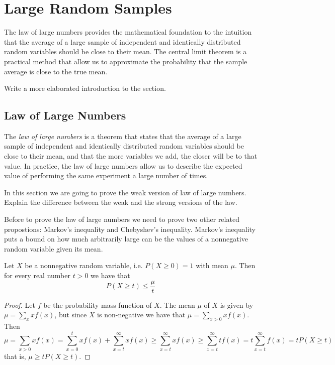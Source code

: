 %
%

\section{Large Random Samples}
\label{sec:probability_random_samples}

The law of large numbers provides the mathematical foundation to the intuition that the average of a large sample of independent and identically distributed random variables should be close to their mean. The central limit theorem is a practical method that allow us to approximate the probability that the sample average is close to the true mean.

{\color{red} Write a more elaborated introduction to the section.}


\subsection{Law of Large Numbers}

The \emph{law of large numbers} is a theorem that states that the average of a large sample of independent and identically distributed random variables should be close to their mean, and that the more variables we add, the closer will be to that value. In practice, the law of large numbers allow us to describe the expected value of performing the same experiment a large number of times.

In this section we are going to prove the weak version of law of large numbers. {\color{red} Explain the difference between the weak and the strong versions of the law.}

Before to prove the law of large numbers we need to prove two other related propostions: Markov's inequality and Chebyshev's inequality. Markov's inequality puts a bound on how much arbitrarily large can be the values of a nonnegative random variable given its mean. 

\begin{proposition}
Let $X$ be a nonnegative random variable, i.e. $P\left( X \geq 0 \right) = 1$ with mean $\mu$. Then for every real number $t>0$ we have that 
\[
P \left( X \geq t \right) \leq \frac{\mu}{t}
\]
\end{proposition}
\begin{proof}
Let $f$ be the probability mass function of $X$. The mean $\mu$ of $X$ is given by $\mu = \sum_{x} x f \left( x \right)$, but since $X$ is non-negative we have that $\mu = \sum_{x>0} x f \left( x \right)$. Then
\[
\mu = \sum_{x>0} x f \left( x \right) = \sum_{x=0}^{t} x f \left( x \right) + \sum_{x=t}^{\infty} x f \left( x \right) \geq
\sum_{x=t}^{\infty} x f \left( x \right) \geq \sum_{x=t}^{\infty} t f \left( x \right) = t \sum_{x=t}^{\infty} f \left( x \right) =
t P \left( X \geq t \right)
\]
that is, $\mu \geq t P \left( X \geq t \right)$.
\end{proof}

